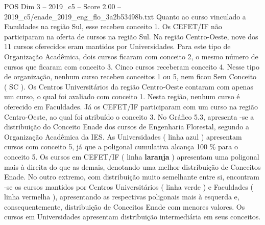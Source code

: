 \begin{textsample}{POS Dim 3 – 2019\_c5 – Score 2.00 – 2019\_c5/enade\_2019\_eng\_flo\_3a2b53498b.txt}
Quanto ao curso vinculado a Faculdades na região Sul, esse recebeu conceito 1.
Os CEFET/IF não participaram na oferta de cursos na região Sul.
Na região Centro-Oeste, nove dos 11 cursos oferecidos eram mantidos por Universidades.
Para este tipo de Organização Acadêmica, dois cursos ficaram com conceito 2, o mesmo número de cursos que ficaram com conceito 3.
Cinco cursos receberam conceito 4.
Nesse tipo de organização, nenhum curso recebeu conceitos 1 ou 5, nem ficou Sem Conceito ( SC ).
Os Centros Universitários da região Centro-Oeste contaram com apenas um curso, o qual foi avaliado com conceito 1.
Nesta região, nenhum curso é oferecido em Faculdades.
Já os CEFET/IF participaram com um curso na região Centro-Oeste, ao qual foi atribuído o conceito 3.
No Gráfico 5.3, apresenta -se a distribuição do Conceito Enade dos cursos de Engenharia Florestal, segundo a Organização Acadêmica da IES.
As Universidades ( linha azul ) apresentam cursos com conceito 5, já que a poligonal cumulativa alcança 100 \% para o conceito 5.
Os cursos em CEFET/IF ( linha \textbf{laranja} ) apresentam uma poligonal mais à direita do que as demais, denotando uma melhor distribuição de Conceitos Enade.
No outro extremo, com distribuição muito semelhante entre si, encontram -se os cursos mantidos por Centros Universitários ( linha verde ) e Faculdades ( linha vermelha ), apresentando as respectivas poligonais mais à esquerda e, consequentemente, distribuição de Conceitos Enade com menores valores.
Os cursos em Universidades apresentam distribuição intermediária em seus conceitos.

\end{textsample}
